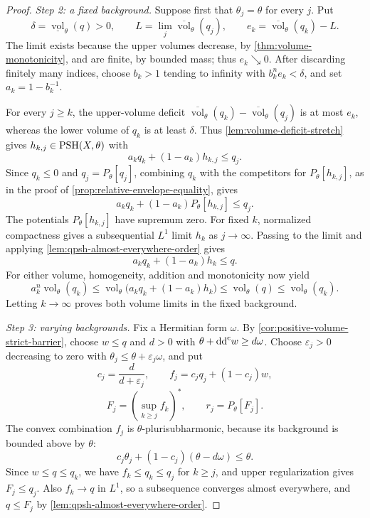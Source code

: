 \begin{proof}
\emph{Step 2: a fixed background.} Suppose first that $\theta_j=\theta$ for every $j$. Put
\[
 \delta=\underline{\operatorname{vol}}_\theta(q)>0,
 \qquad L=\lim_j\overline{\operatorname{vol}}_\theta(q_j),
 \qquad e_k=\overline{\operatorname{vol}}_\theta(q_k)-L.
\]
The limit exists because the upper volumes decrease, by \cref{thm:volume-monotonicity}, and are finite, by bounded mass; thus $e_k\searrow0$. After discarding finitely many indices, choose $b_k>1$ tending to infinity with $b_k^n e_k<\delta$, and set $a_k=1-b_k^{-1}$.

For every $j\geq k$, the upper-volume deficit $\overline{\operatorname{vol}}_\theta(q_k)-\overline{\operatorname{vol}}_\theta(q_j)$ is at most $e_k$, whereas the lower volume of $q_k$ is at least $\delta$. Thus \cref{lem:volume-deficit-stretch} gives $h_{k,j}\in\mathrm{PSH}(X,\theta)$ with
\[
 a_kq_k+(1-a_k)h_{k,j}\leq q_j.
\]
Since $q_k\leq0$ and $q_j=P_\theta[q_j]$, combining $q_k$ with the competitors for $P_\theta[h_{k,j}]$, as in the proof of \cref{prop:relative-envelope-equality}, gives
\[
 a_kq_k+(1-a_k)P_\theta[h_{k,j}]\leq q_j.
\]
The potentials $P_\theta[h_{k,j}]$ have supremum zero. For fixed $k$, normalized compactness gives a subsequential $L^1$ limit $h_k$ as $j\to\infty$. Passing to the limit and applying \cref{lem:qpsh-almost-everywhere-order} gives
\[
 a_kq_k+(1-a_k)h_k\leq q.
\]
For either volume, homogeneity, addition and monotonicity now yield
\[
 a_k^n\operatorname{vol}_\theta(q_k)
 \leq\operatorname{vol}_\theta\bigl(a_kq_k+(1-a_k)h_k\bigr)
 \leq\operatorname{vol}_\theta(q)
 \leq\operatorname{vol}_\theta(q_k).
\]
Letting $k\to\infty$ proves both volume limits in the fixed background.

\emph{Step 3: varying backgrounds.} Fix a Hermitian form $\omega$. By \cref{cor:positive-volume-strict-barrier}, choose $w\leq q$ and $d>0$ with $\theta+\mathrm{dd}^{\mathrm{c}} w\geq d\omega$. Choose $\varepsilon_j>0$ decreasing to zero with $\theta_j\leq\theta+\varepsilon_j\omega$, and put
\[
 c_j=\frac d{d+\varepsilon_j},\qquad
 f_j=c_jq_j+(1-c_j)w,
\]
\[
 F_j=\left(\sup_{k\geq j}f_k\right)^*,\qquad
 r_j=P_\theta[F_j].
\]
The convex combination $f_j$ is $\theta$-plurisubharmonic, because its background is bounded above by $\theta$:
\[
 c_j\theta_j+(1-c_j)(\theta-d\omega)\leq\theta.
\]
Since $w\leq q\leq q_k$, we have $f_k\leq q_k\leq q_j$ for $k\geq j$, and upper regularization gives $F_j\leq q_j$. Also $f_k\to q$ in $L^1$, so a subsequence converges almost everywhere, and $q\leq F_j$ by \cref{lem:qpsh-almost-everywhere-order}.


\end{proof}

